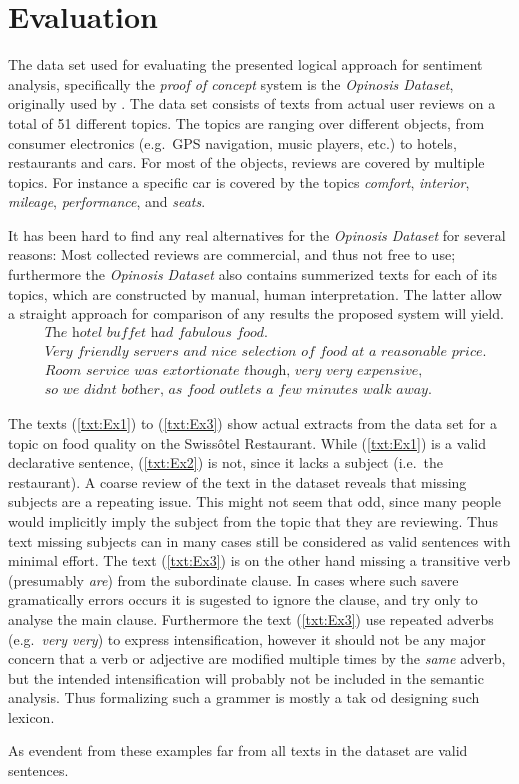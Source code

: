 
\chapter{Evaluation}
\label{chap:evaluation}


The data set used for evaluating the presented logical approach for sentiment analysis, specifically the \emph{proof of concept} system is the \emph{Opinosis Dataset}, originally used by \cite{Opinosis}. The data set consists of texts from actual user reviews on a total of 51 different topics. The topics are ranging over different objects, from consumer electronics (e.g.\ GPS navigation, music players, etc.) to hotels, restaurants and cars. For most of the objects, reviews are covered by multiple topics. For instance a specific car is covered by the topics \emph{comfort}, \emph{interior}, \emph{mileage}, \emph{performance}, and \emph{seats}.

It has been hard to find any real alternatives for the \emph{Opinosis Dataset} for several reasons: Most collected reviews are commercial, and thus not free to use; furthermore the \emph{Opinosis Dataset} also contains summerized texts for each of its topics, which are constructed by manual, human interpretation. The latter allow a straight approach for comparison of any results the proposed system will yield.\\
\begin{align}
  &\textit{The hotel buffet had fabulous food.}
  \label{txt:Ex1} \\[3mm]  
  &\textit{Very friendly servers and nice selection of food at a reasonable price.}
  \label{txt:Ex2} \\[3mm]  
  &\textit{Room service was extortionate though, very very expensive,} \nonumber \\
  &\textit{so we didnt bother, as food outlets a few minutes walk away.}
  \label{txt:Ex3}
\end{align}

The texts (\ref{txt:Ex1}) to (\ref{txt:Ex3}) show actual extracts from the data set for a topic on food quality on the Swissôtel Restaurant. While (\ref{txt:Ex1}) is a valid declarative sentence, (\ref{txt:Ex2}) is not, since it lacks a subject (i.e.\ the restaurant). A coarse review of the text in the dataset reveals that missing subjects are a repeating issue. This might not seem that odd, since many people would implicitly imply the subject from the topic that they are reviewing. Thus text missing subjects can in many cases still be considered as valid sentences with minimal effort. The text (\ref{txt:Ex3}) is on the other hand missing a transitive verb (presumably \emph{are}) from the subordinate clause. In cases where such savere gramatically errors occurs it is sugested to ignore the clause, and try only to analyse the main clause. Furthermore the text (\ref{txt:Ex3}) use repeated adverbs (e.g.\ \emph{very very}) to express intensification, however it should not be any major concern that a verb or adjective are modified multiple times by the \emph{same} adverb, but the intended intensification will probably not be included in the semantic analysis. Thus formalizing such a grammer is mostly a tak od designing such lexicon.

As evendent from these examples far from all texts in the dataset are valid sentences.
